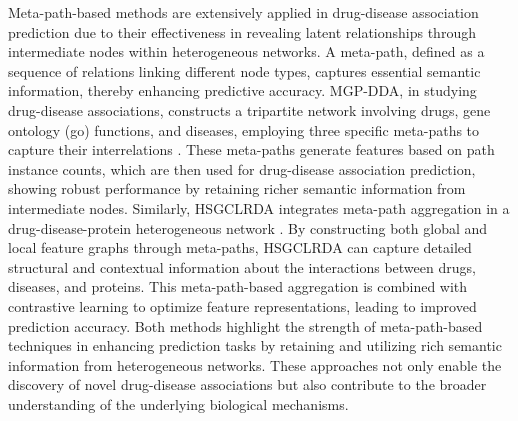 Meta-path-based methods are extensively applied in drug-disease association prediction due to their effectiveness in revealing latent relationships through intermediate nodes within heterogeneous networks. A meta-path, defined as a sequence of relations linking different node types, captures essential semantic information, thereby enhancing predictive accuracy. MGP-DDA, in studying drug-disease associations, constructs a tripartite network involving drugs, gene ontology (go) functions, and diseases, employing three specific meta-paths to capture their interrelations \cite{kawichai2021meta}. These meta-paths generate features based on path instance counts, which are then used for drug-disease association prediction, showing robust performance by retaining richer semantic information from intermediate nodes. Similarly, HSGCLRDA integrates meta-path aggregation in a drug-disease-protein heterogeneous network \cite{wang2024hierarchical}. By constructing both global and local feature graphs through meta-paths, HSGCLRDA can capture detailed structural and contextual information about the interactions between drugs, diseases, and proteins. This meta-path-based aggregation is combined with contrastive learning to optimize feature representations, leading to improved prediction accuracy. Both methods highlight the strength of meta-path-based techniques in enhancing prediction tasks by retaining and utilizing rich semantic information from heterogeneous networks. These approaches not only enable the discovery of novel drug-disease associations but also contribute to the broader understanding of the underlying biological mechanisms.